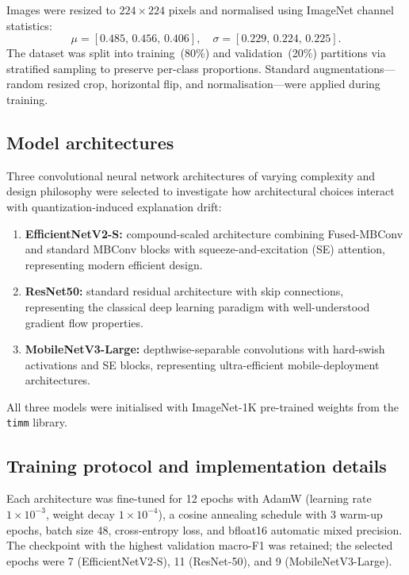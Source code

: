 \documentclass[fleqn,10pt]{wlscirep}
\begin{document}
Images were resized to $224 \times 224$ pixels and normalised using ImageNet channel statistics:
\[
\mu = [0.485,\, 0.456,\, 0.406], \quad \sigma = [0.229,\, 0.224,\, 0.225].
\]
The dataset was split into training~(80\%) and validation~(20\%) partitions via stratified sampling to preserve per-class proportions. Standard augmentations---random resized crop, horizontal flip, and normalisation---were applied during training.

\subsection*{Model architectures}

Three convolutional neural network architectures of varying complexity and design philosophy were selected to investigate how architectural choices interact with quantization-induced explanation drift:

\begin{enumerate}[leftmargin=1.5em, itemsep=2pt]
  \item \textbf{EfficientNetV2-S\cite{Tan2021efficientnetv2}:} compound-scaled architecture combining Fused-MBConv and standard MBConv blocks with squeeze-and-excitation (SE) attention, representing modern efficient design.
  \item \textbf{ResNet50\cite{He2016resnet}:} standard residual architecture with skip connections, representing the classical deep learning paradigm with well-understood gradient flow properties.
  \item \textbf{MobileNetV3-Large\cite{Howard2019mobilenetv3}:} depthwise-separable convolutions with hard-swish activations and SE blocks, representing ultra-efficient mobile-deployment architectures.
\end{enumerate}

All three models were initialised with ImageNet-1K pre-trained weights from the \texttt{timm} library\cite{Wightman2021timm}.

\subsection*{Training protocol and implementation details}

Each architecture was fine-tuned for 12 epochs with AdamW (learning rate $1 \times 10^{-3}$, weight decay $1 \times 10^{-4}$), a cosine annealing schedule with 3 warm-up epochs, batch size 48, cross-entropy loss, and bfloat16 automatic mixed precision. The checkpoint with the highest validation macro-F1 was retained; the selected epochs were 7 (EfficientNetV2-S), 11 (ResNet-50), and 9 (MobileNetV3-Large).
\end{document}
